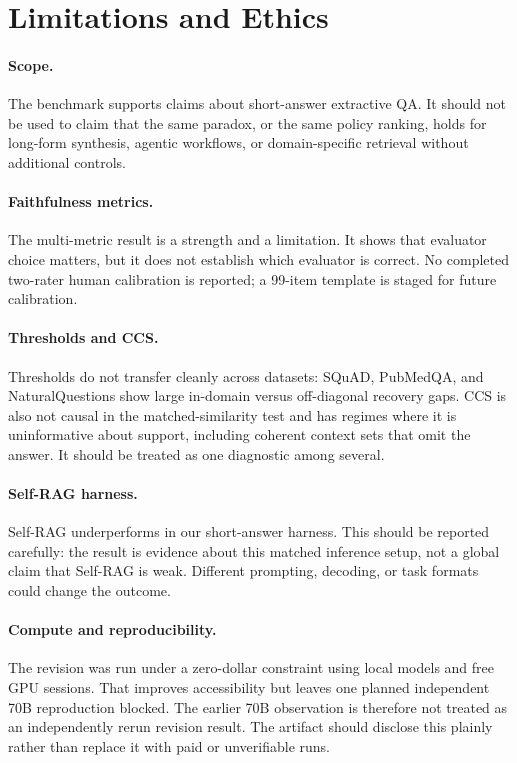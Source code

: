 \section{Limitations and Ethics}

\paragraph{Scope.}
The benchmark supports claims about short-answer extractive QA. It should not
be used to claim that the same paradox, or the same policy ranking, holds for
long-form synthesis, agentic workflows, or domain-specific retrieval without
additional controls.

\paragraph{Faithfulness metrics.}
The multi-metric result is a strength and a limitation. It shows that evaluator
choice matters, but it does not establish which evaluator is correct. No
completed two-rater human calibration is reported; a 99-item template is staged
for future calibration.

\paragraph{Thresholds and CCS.}
Thresholds do not transfer cleanly across datasets: SQuAD, PubMedQA, and
NaturalQuestions show large in-domain versus off-diagonal recovery gaps. CCS is
also not causal in the matched-similarity test and has regimes where it is
uninformative about support, including coherent context sets that omit the
answer. It should be treated as one diagnostic among several.

\paragraph{Self-RAG harness.}
Self-RAG underperforms in our short-answer harness. This should be reported
carefully: the result is evidence about this matched inference setup, not a
global claim that Self-RAG is weak. Different prompting, decoding, or task
formats could change the outcome.

\paragraph{Compute and reproducibility.}
The revision was run under a zero-dollar constraint using local models and free
GPU sessions. That improves accessibility but leaves one planned independent
70B reproduction blocked. The earlier 70B observation is therefore not treated
as an independently rerun revision result. The artifact should disclose this
plainly rather than replace it with paid or unverifiable runs.

